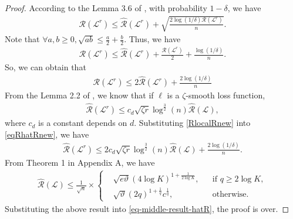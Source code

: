 \documentclass{article}
\begin{document}
\begin{proof}
  According to the Lemma 3.6 of \cite{oneto2013improved},
  with probability $1-\delta$, we have
  \begin{align*}
    \mathcal{R}(\mathcal{L}^r)\leq \hat{\mathcal{R}}(\mathcal{L}^r)+\sqrt{\frac{2\log(1/\delta)\mathcal{R}(\mathcal{L}^r)}{n}}.
  \end{align*}
  Note that $\forall a,b\geq 0, \sqrt{ab}\leq \frac{a}{2}+\frac{b}{2}$.
  Thus, we have
  \begin{align*}
    \mathcal{R}(\mathcal{L}^r)\leq \hat{\mathcal{R}}(\mathcal{L}^r)+\frac{\mathcal{R}(\mathcal{L}^r)}{2}+\frac{\log(1/\delta)}{n}.
  \end{align*}
  So, we can obtain that
  \begin{align}
  \label{eqRhatRnew}
    \mathcal{R}(\mathcal{L}^r)\leq 2\hat{\mathcal{R}}(\mathcal{L}^r)+\frac{2\log(1/\delta)}{n}
  \end{align}
  From the Lemma 2.2 of \cite{Srebro2010lrc},
  we know that if $\ell$ is a $\zeta$-smooth loss function,
  \begin{align}
   \label{RlocalRnew}
    \hat{\mathcal{R}}(\mathcal{L}^r)\leq c_d\sqrt{\zeta r}\log^{\frac{3}{2}}(n)\hat{\mathcal{R}}(\mathcal{L}),
  \end{align}
  where $c_d$ is a constant depends on $d$.
  Substituting  \eqref{RlocalRnew} into \eqref{eqRhatRnew},
  we have
  \begin{align}
  \label{eq-middle-result-hatR}
    \hat{\mathcal{R}}(\mathcal{L}^r)\leq 2c_d\sqrt{\zeta r}\log^{\frac{3}{2}}(n)\hat{\mathcal{R}}(\mathcal{L})
    +\frac{2\log(1/\delta)}{n}.
  \end{align}
  From Theorem 1 in Appendix A,
  we have
  \begin{align*}
    \hat{\mathcal{R}}(\mathcal{L})\leq \frac{1}{\sqrt{n}}\times
      \left\{
      \begin{aligned}
      &\sqrt{e\vartheta}(4\log K)^{1+\frac{1}{2\log K}}, &&\text{if } q\geq 2\log K,\\
      &\sqrt{\vartheta}(2q)^{1+\frac{1}{q}}c^{\frac{1}{q}}, &&\text{otherwise.}
      \end{aligned}
      \right.
  \end{align*}
  Substituting the above result into \eqref{eq-middle-result-hatR},
  the proof is over.
\end{proof}
\end{document}
